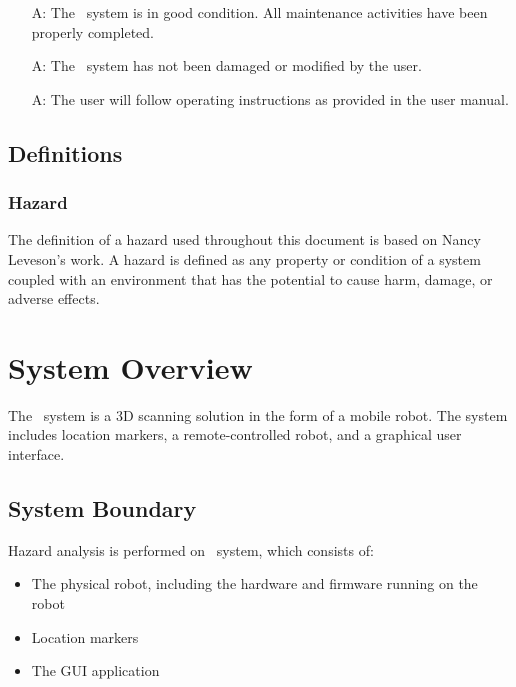 \documentclass[12pt]{article}
\newcounter{assumpnum} %
\begin{document}
\noindent \begin{itemize}
\item[A\refstepcounter{assumpnum}\theassumpnum \label{Assumption1}:] The \progname ~system is in good condition. All maintenance activities have been properly completed. 

\item[A\refstepcounter{assumpnum}\theassumpnum \label{Assumption2}:]The \progname ~system has not been damaged or modified by the user.

\item[A\refstepcounter{assumpnum}\theassumpnum \label{Assumption4}:] The user will follow operating instructions as provided in the user manual.

\end{itemize}

\subsection{Definitions}

\subsubsection{Hazard}

The definition of a hazard used throughout this document is based on  Nancy Leveson's work. A hazard is defined as any property or condition of a system coupled with an environment that has the potential to cause harm, damage, or adverse effects.

\section{System Overview}

The \progname ~system is a 3D scanning solution in the form of a mobile robot. The system includes location markers, a remote-controlled robot, and a graphical user interface.

\subsection{System Boundary}

Hazard analysis is performed on \progname ~system, which consists of: 

\begin{itemize}
\item The physical robot, including the hardware and firmware running on the robot
\item Location markers
\item The GUI application
\end{itemize}
\end{document}
